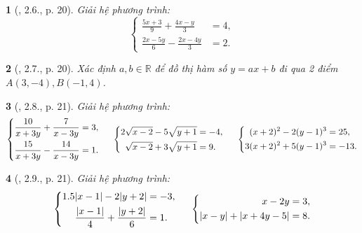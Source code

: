 \documentclass{article}
\newtheorem{baitoan}{}
\begin{document}
\begin{baitoan}[\cite{Binh_boi_duong_Toan_9_tap_2}, 2.6., p. 20]
	Giải hệ phương trình:
	\begin{equation*}
		\left\{\begin{split}
			\frac{5x + 3}{9} + \frac{4x - y}{3} &= 4,\\
			\frac{2x - 5y}{6} - \frac{2x - 4y}{3} &= 2.
		\end{split}\right.
	\end{equation*}
\end{baitoan}

\begin{baitoan}[\cite{Binh_boi_duong_Toan_9_tap_2}, 2.7., p. 20]
	Xác định $a,b\in\mathbb{R}$ để đồ thị hàm số $y = ax + b$ đi qua 2 điểm $A(3,-4),B(-1,4)$.
\end{baitoan}

\begin{baitoan}[\cite{Binh_boi_duong_Toan_9_tap_2}, 2.8., p. 21]
	Giải hệ phương trình:
	\begin{equation*}
		\left\{\begin{split}
			\frac{10}{x + 3y} + \frac{7}{x - 3y} &= 3,\\
			\frac{15}{x + 3y} - \frac{14}{x - 3y} &= 1.
		\end{split}\right.\hspace{5mm}
		\left\{\begin{split}
			2\sqrt{x - 2} - 5\sqrt{y + 1} &= -4,\\
			\sqrt{x - 2} + 3\sqrt{y + 1} &= 9.
		\end{split}\right.\hspace{5mm}
		\left\{\begin{split}
			(x + 2)^2 - 2(y - 1)^3 &= 25,\\
			3(x + 2)^2 + 5(y - 1)^3 &= -13.
		\end{split}\right.
	\end{equation*}
\end{baitoan}

\begin{baitoan}[\cite{Binh_boi_duong_Toan_9_tap_2}, 2.9., p. 21]
	Giải hệ phương trình:
	\begin{equation*}
		\left\{\begin{split}
			1.5|x - 1| - 2|y + 2| &= -3,\\
			\frac{|x - 1|}{4} + \frac{|y + 2|}{6} &= 1.
		\end{split}\right.\hspace{5mm}
		\left\{\begin{split}
			x - 2y &= 3,\\
			|x - y| + |x + 4y - 5| &= 8.
		\end{split}\right.
	\end{equation*}
\end{baitoan}
\end{document}
